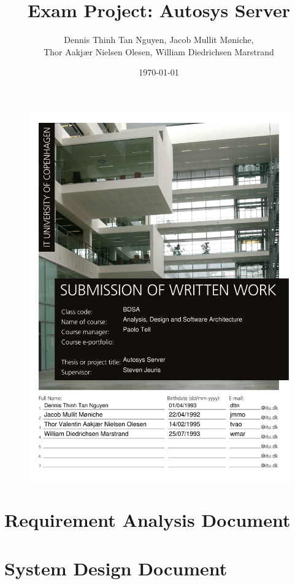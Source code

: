 \documentclass{article}
\author{Dennis Thinh Tan Nguyen, Jacob Mullit Møniche,\\
	 Thor Aakjær Nielsen Olesen, William Diedrichsen Marstrand}
\title{Exam Project: Autosys Server}
\date{\today}
\begin{document}
\begin{figure}[H]
	\includegraphics[width = \linewidth]{FrontPage}
\end{figure}
\pagebreak
\maketitle
\newpage

\tableofcontents
\pagebreak

\section{ Requirement Analysis Document}
	
\section{System Design Document}		
	
\end{document}

